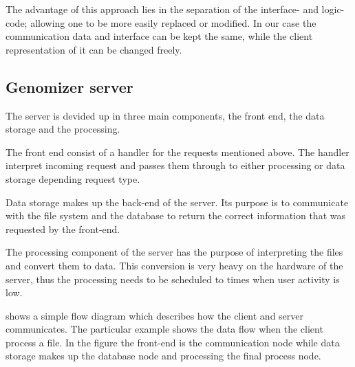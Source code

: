  The advantage of this approach lies in the separation of the interface- and logic-code; allowing one to be more easily replaced or modified. In our case the communication data and interface can be kept the same, while the client representation of it can be changed freely.
 

\subsection{Genomizer server}
The server is devided up in three main components, the front end, the data storage and the processing.

The front end consist of a handler for the  requests mentioned above. The handler interpret incoming request and passes them through to either processing or data storage depending request type.

Data storage makes up the back-end of the server. Its purpose is to communicate with the file system and the database to return the correct information that was requested by the front-end.

The processing component of the server has the purpose of interpreting the  files and convert them to  data. This conversion is very heavy on the hardware of the server, thus the processing needs to be scheduled to times when user activity is low.

 shows a simple flow diagram which describes how the client and server
 communicates. The particular example shows the data flow when the client process a file.
 In the figure the front-end is the communication node while data storage makes up the database node and processing the final process node.

